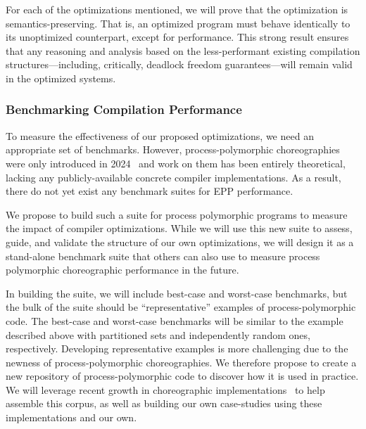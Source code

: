 
For each of the optimizations mentioned, we will prove that the optimization is semantics-preserving.
That is, an optimized program must behave identically to its unoptimized counterpart, except for performance.
This strong result ensures that any reasoning and analysis based on the less-performant
existing compilation structures---including, critically, deadlock freedom guarantees---will remain valid in the optimized systems.

\subsubsection{Benchmarking Compilation Performance}

To measure the effectiveness of our proposed optimizations, we need an appropriate set of benchmarks.
However, process-polymorphic choreographies were only introduced in 2024~\citep{GraversenHM24}
and work on them has been entirely theoretical, lacking any publicly-available concrete compiler implementations.
As a result, there do not yet exist any benchmark suites for EPP performance.

We propose to build such a suite for process polymorphic programs to measure the impact of compiler optimizations.
While we will use this new suite to assess, guide, and validate the structure of our own optimizations,
we will design it as a stand-alone benchmark suite that others can also use to measure process polymorphic choreographic performance in the future.

In building the suite, we will include best-case and worst-case benchmarks, but the bulk of the suite should be ``representative'' examples of process-polymorphic code.
The best-case and worst-case benchmarks will be similar to the example described above
with partitioned sets and independently random ones, respectively.
Developing representative examples is more challenging due to the newness of process-polymorphic choreographies.
We therefore propose to create a new repository of process-polymorphic code to discover how it is used in practice.
We will leverage recent growth in choreographic implementations~\citep{ShenKK23,BatesK+25}
to help assemble this corpus, as well as building our own case-studies using these implementations and our own.

